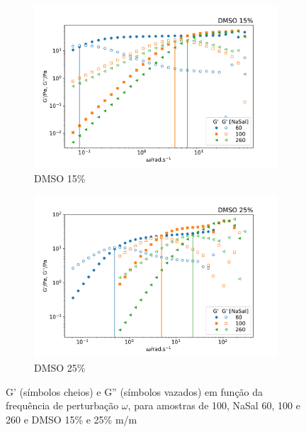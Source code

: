 	\begin{figure}[h]
		\begin{subfigure}[t]{0.5\textwidth}
			\centering
			\includegraphics[width=\textwidth]{imagens/reologia/oscilatorio_dmso15p}
			\caption{DMSO 15\%}
			\label{fig:oscilatorio_dmso_15p}
		\end{subfigure} %
		\begin{subfigure}[t]{0.5\textwidth}
			\centering
			\includegraphics[width=\textwidth]{imagens/reologia/oscilatorio_dmso25p}
			\caption{DMSO 25\%}
			\label{fig:oscilatorio_dmso_25p}
		\end{subfigure} %
		\caption{G' (símbolos cheios) e G'' (símbolos vazados) em função da frequência de perturbação \(\omega\), para amostras de \CTAB{} 100\mM{}, NaSal 60, 100 e 260\mM{} e DMSO 15\% e 25\% m/m}
		\label{fig:oscilatorio_dmso}
	\end{figure}
	
